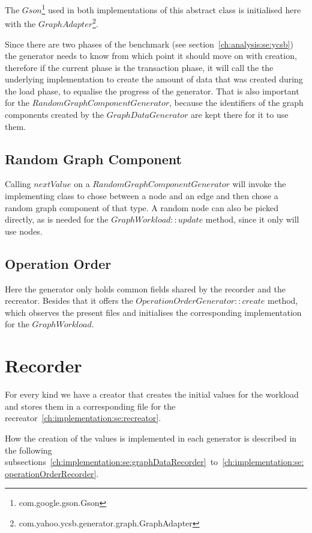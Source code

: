 The $ Gson $\footnote{com.google.gson.Gson} used in both implementations of this abstract class is initialised here with the $ GraphAdapter $\footnote{com.yahoo.ycsb.generator.graph.GraphAdapter}.

Since there are two phases of the benchmark (see section~\ref{ch:analysis:se:ycsb}) the generator needs to know from which point it should move on with creation,
therefore if the current phase is the transaction phase,
it will call the the underlying implementation to create the amount of data that was created during the load phase,
to equalise the progress of the generator.
That is also important for the $ RandomGraphComponentGenerator $,
because the identifiers of the graph components created by the $ GraphDataGenerator $ are kept there for it to use them.

\subsection{Random Graph Component}
Calling $ nextValue $ on a $ RandomGraphComponentGenerator $ will invoke the implementing class to chose between a node and an edge and then chose a random graph component of that type.
A random node can also be picked directly,
as is needed for the $ GraphWorkload::update $ method,
since it only will use nodes.

\subsection{Operation Order}
Here the generator only holds common fields shared by the recorder and the recreator.
Besides that it offers the $ OperationOrderGenerator::create $ method,
which observes the present files and initialises the corresponding implementation for the $ Graph Workload $.

\section{Recorder}
\label{ch:implementation:se:recorder}
For every kind we have a creator that creates the initial values for the workload and stores them in a corresponding file for the recreator~\ref{ch:implementation:se:recreator}.

How the creation of the values is implemented in each generator is described in the following subsections~\ref{ch:implementation:se:graphDataRecorder}~to~\ref{ch:implementation:se:operationOrderRecorder}.

